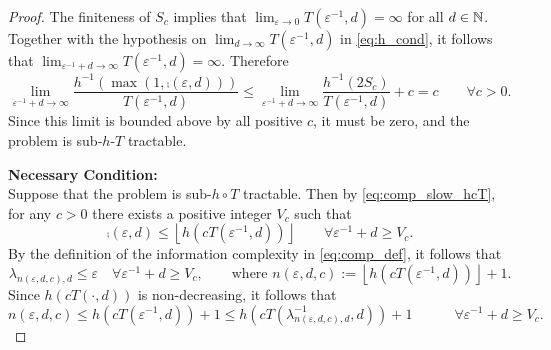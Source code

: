 \documentclass[11pt,a4paper]{article}
\begin{document}
\begin{proof}
The finiteness of $S_c$ implies that $\lim_{\varepsilon \to 0} T(\varepsilon^{-1},d) = \infty$ for all $d \in \mathbb{N}$.  Together with  the hypothesis on $\lim_{d \to \infty} T(\varepsilon^{-1},d)$ in \eqref{eq:h_cond}, it follows that $\lim_{\varepsilon^{-1} + d \to \infty} T(\varepsilon^{-1},d) = \infty$.  Therefore
\begin{equation*}
	\lim_{\varepsilon^{-1} + d \to \infty} \frac{h^{-1}(\max(1,\comp(\varepsilon,d)))}{T(\varepsilon^{-1},d)}
	\le \lim_{\varepsilon^{-1} + d \to \infty} \frac{h^{-1} (2 S_c)}{T(\varepsilon^{-1},d)}  + c = c \qquad\forall c >  0.
\end{equation*}
Since this limit is bounded above by all positive $c$, it must be zero, and the problem is sub-$h$-$T$ tractable.


\bigskip

\noindent \textbf{Necessary Condition:}\\
Suppose that the problem is  sub-$h \circ T$ tractable. Then by \eqref{eq:comp_slow_hcT}, for any $c>0$ there exists a positive integer $V_c$ such that
\begin{equation*}
	\comp(\varepsilon,d) \le \left\lfloor h(cT(\varepsilon^{-1},d)) \right\rfloor \qquad \forall \varepsilon^{-1} + d \ge V_c.
\end{equation*}
By the definition of the information complexity in \eqref{eq:comp_def}, it follows that
\[
	\lambda_{n(\varepsilon,d,c),d} \le \varepsilon \quad \forall \varepsilon^{-1} + d \ge V_c, \qquad \text{where }
	n(\varepsilon,d,c):=\left\lfloor h(cT(\varepsilon^{-1},d)) \right\rfloor +1.
\]
Since $h(cT(\cdot,d))$ is non-decreasing, it follows that
\begin{equation}
		n(\varepsilon,d,c)\le  h(cT(\varepsilon^{-1},d)) +1\le  h(cT(\lambda^{-1}_{n(\varepsilon,d,c),d},d)) +1\qquad  \quad \forall \varepsilon^{-1} + d \ge V_c. \label{eq:nedcbound}
\end{equation}


\end{proof}
\end{document}
